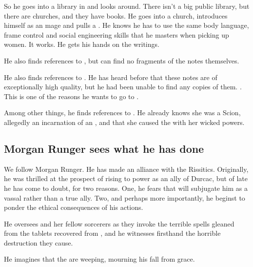 So he goes into a library in \Forclin{} and looks around. 
There isn't a big public library, but there are churches, and they have books. 
He goes into a church, introduces himself as an \ishrah{} mage and pulls a .
He knows he has to use the same body language, frame control and social engineering skills that he masters when picking up women.
It works.
He gets his hands on the writings.

He also finds references to , but can find no fragments of the notes themselves. 

He also finds references to . 
He has heard before that these notes are of exceptionally high quality, but he had been unable to find any copies of them. 
. 
This is one of the reasons he wants to go to \Redce. 

Among other things, he finds references to \Belzir. 
He already knows she was a Scion, allegedly an incarnation of an  \malach, and that she caused the \HundredScourges with her wicked \malach powers. 









\subsection{Morgan Runger sees what he has done}
We follow Morgan Runger. He has made an alliance with the Rissitics. Originally, he was thrilled at the prospect of rising to power as an ally of Durcac, but of late he has come to doubt, for two reasons. One, he fears that \Nechsain{} will subjugate him as a vassal rather than a true ally. Two, and perhaps more importantly, he beginst to ponder the ethical consequences of his actions. 

He oversees \Takestsha{} and her fellow sorcerers as they invoke the terrible spells gleaned from the tablets recovered from \Rungertemple, and he witnesses firsthand the horrible destruction they cause. 

He imagines that the \sephiroth{} are weeping, mourning his fall from grace.


